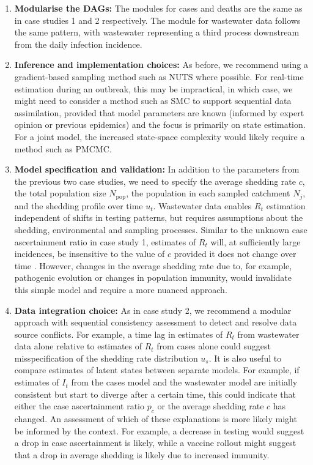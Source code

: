 \documentclass{article}
\begin{document}
\begin{enumerate}
\item \textbf{Modularise the DAGs:} The modules for cases and deaths are the same as in case studies 1 and 2 respectively. The module for wastewater data follows the same pattern, with wastewater representing a third process downstream from the daily infection incidence.
    
    \item \textbf{Inference and implementation choices:} As before, we recommend using a gradient-based sampling method such as NUTS where possible. For real-time estimation during an outbreak, this may be impractical, in which case, we might need to consider a method such as SMC to support sequential data assimilation, provided that model parameters are known (informed by expert opinion or previous epidemics) and the focus is primarily on state estimation.  For a joint model, the increased state-space complexity would likely require a method such as PMCMC.

    \item \textbf{Model specification and validation:} In addition to the parameters from the previous two case studies, we need to specify the average shedding rate $c$, the total population size $N_\mathrm{pop}$, the population in each sampled catchment $N_j$, and the shedding profile over time $u_t$. Wastewater data enables $R_t$ estimation independent of shifts in testing patterns, but requires assumptions about the shedding, environmental and sampling processes. Similar to the unknown case ascertainment ratio in case study 1, estimates of $R_t$ will, at sufficiently large incidences, be insensitive to the value of $c$ provided it does not change over time \citep{dreifuss2025estimated}. However, changes in the average shedding rate due to, for example, pathogenic evolution or changes in population immunity, would invalidate this simple model and require a more nuanced approach. 
    
    \item \textbf{Data integration choice:} As in case study 2, we recommend a modular approach with sequential consistency assessment to detect and resolve data source conflicts. For example, a time lag in estimates of $R_t$ from wastewater data alone relative to estimates of $R_t$ from cases alone could suggest misspecification of the shedding rate distribution $u_s$.  It is also useful to compare estimates of latent states between separate models. For example, if estimates of $I_t$ from the cases model and the wastewater model are initially consistent but start to diverge after a certain time, this could indicate that either the case ascertainment ratio $p_c$ or the average shedding rate $c$ has changed. An assessment of which of these explanations is more likely might be informed by the context. For example, a decrease in testing would suggest a drop in case ascertainment is likely, while a vaccine rollout might suggest that a drop in average shedding is likely due to increased immunity. 


\end{enumerate}
\end{document}
